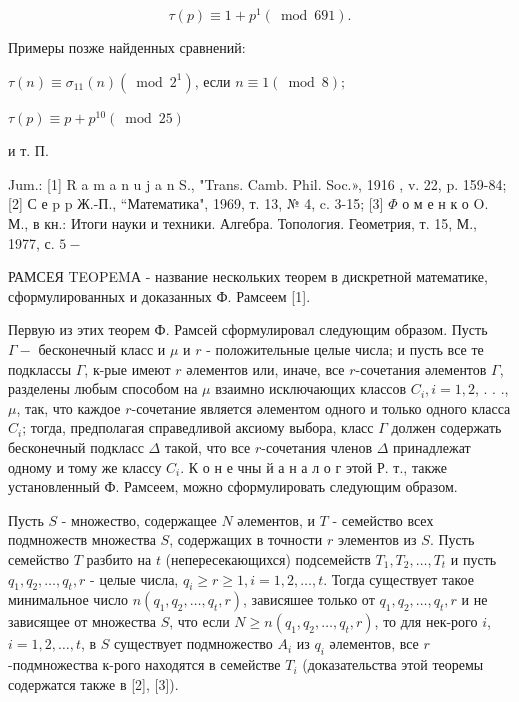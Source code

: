 \documentclass[10pt]{article}
\begin{document}
\[

\tau(p) \equiv 1+p^{1}(\bmod 691) .

\]



Примеры позже найденных сравнений:



$\tau(n) \equiv \sigma_{11}(n)\left(\bmod 2^{1}\right)$, если $n \equiv 1(\bmod 8) ;$



$\tau(p) \equiv p+p^{10}(\bmod 25)$



и т. П.



Jum.: [1] R a m a n u j a n S., "Trans. Camb. Phil. Soc.», 1916 , v. 22, p. 159-84; [2] С е p p Ж.-П., “Математика", 1969, т. 13, № 4, c. 3-15; [3] $\Phi$ о м е н к о O. М., в кн.: Итоги науки и техники. Алгебра. Топология. Геометрия, т. 15, М., 1977, с. $5-$



РАМСЕЯ TEOPEMА - название нескольких теорем в дискретной математике, сформулированных и доказанных Ф. Рамсеем [1].



Первую из этих теорем Ф. Рамсей сформулировал следующим образом. Пусть $\Gamma-$ бесконечный класс и $\mu$ и $r$ - положительные целые числа; и пусть все те подклассы $\Gamma$, к-рые имеют $r$ әлементов или, иначе, все $r$-сочетания әлементов $\Gamma$, разделены любым способом на $\mu$ взаимно исключающих классов $C_{i}, i=1,2$, . . ., $\mu$, так, что каждое $r$-сочетание является әлементом одного и только одного класса $C_{i}$; тогда, предполагая справедливой аксиому выбора, класс $\Gamma$ должен содержать бесконечный подкласс $\Delta$ такой, что все $r$-сочетания членов $\Delta$ принадлежат одному и тому же классу $C_{i}$. К о н е чны й а н а л о г этой Р. т., также установленный Ф. Рамсеем, можно сформулировать следующим образом.



Пусть $S$ - множество, содержащее $N$ әлементов, и $T$ - семейство всех подмножеств множества $S$, содержащих в точности $r$ элементов из $S$. Пусть семейство $T$ разбито на $t$ (непересекающихся) подсемейств $T_{1}, T_{2}, \ldots, T_{t}$ и пусть $q_{1}, q_{2}, \ldots, q_{t}, r$ - целые числа, $q_{i} \geqslant r \geqslant 1, i=1,2, \ldots, t$. Тогда существует такое минимальное число $n\left(q_{1}, q_{2}, \ldots, q_{t}, r\right)$, зависяшее только от $q_{1}, q_{2}, \ldots, q_{t}, r$ и не зависящее от множества $S$, что если $N \geqslant n\left(q_{1}, q_{2}, \ldots, q_{t}, r\right)$, то для нек-рого $i$, $i=1,2, \ldots, t$, в $S$ существует подмножество $A_{i}$ из $q_{i}$ әлементов, все $r$-подмножества к-рого находятся в семействе $T_{i}$ (доказательства этой теоремы содержатся также в [2], [3]).
\end{document}
